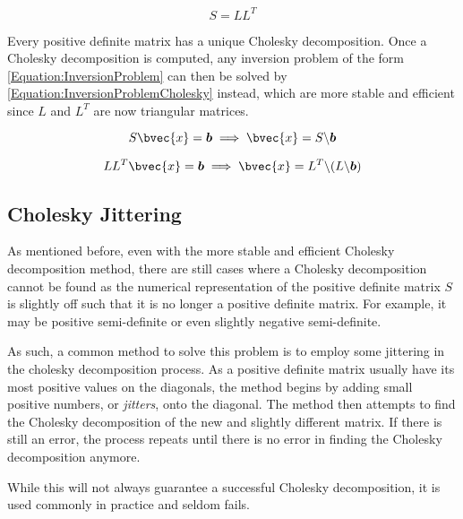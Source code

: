 			\begin{equation}
				S = L L^{T}
			\label{Equation:CholeskyDecomposition}
			\end{equation}
			
			Every positive definite matrix has a unique Cholesky decomposition. Once a Cholesky decomposition is computed, any inversion problem of the form \eqref{Equation:InversionProblem} can then be solved by \eqref{Equation:InversionProblemCholesky} instead, which are more stable and efficient since $L$ and $L^{T}$ are now triangular matrices.
			
			\begin{equation}
				S \bvec{x} = \vec{b} \implies \bvec{x} = S \backslash \vec{b}
			\label{Equation:InversionProblem}
			\end{equation}
			
			\begin{equation}
				L L^{T} \bvec{x} = \vec{b} \implies \bvec{x} = L^{T} \backslash (L \backslash \vec{b})
			\label{Equation:InversionProblemCholesky}
			\end{equation}
			
		\subsection{Cholesky Jittering}
		\label{Appendix:ComputationalAspects:NumericalStability:CholeskyJittering}

			As mentioned before, even with the more stable and efficient Cholesky decomposition method, there are still cases where a Cholesky decomposition cannot be found as the numerical representation of the positive definite matrix $S$ is slightly off such that it is no longer a positive definite matrix. For example, it may be positive semi-definite or even slightly negative semi-definite.
			
			As such, a common method to solve this problem is to employ some jittering in the cholesky decomposition process. As a positive definite matrix usually have its most positive values on the diagonals, the method begins by adding small positive numbers, or \textit{jitters}, onto the diagonal. The method then attempts to find the Cholesky decomposition of the new and slightly different matrix. If there is still an error, the process repeats until there is no error in finding the Cholesky decomposition anymore.
			
			While this will not always guarantee a successful Cholesky decomposition, it is used commonly in practice and seldom fails.
			
